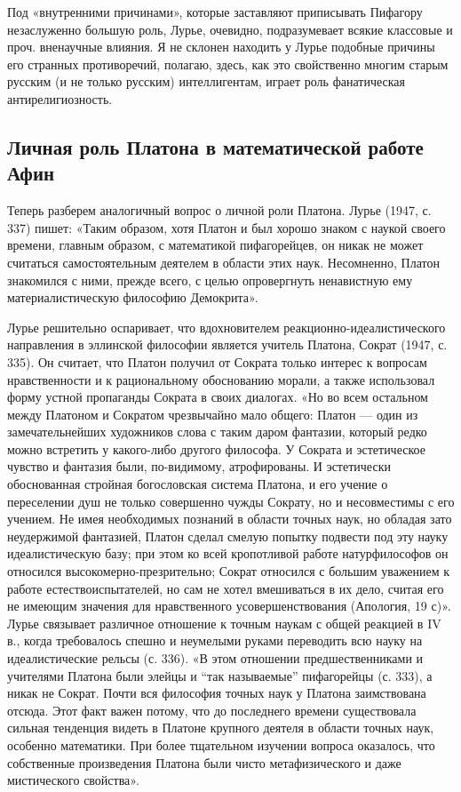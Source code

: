 Под «внутренними причинами», которые заставляют приписывать Пифагору
незаслуженно большую роль, Лурье, очевидно, подразумевает всякие
классовые и проч. вненаучные влияния. Я не склонен находить у Лурье
подобные причины его странных противоречий, полагаю, здесь, как это
свойственно многим старым русским (и не только русским) интеллигентам,
играет роль фанатическая антирелигиозность.

\subsection{Личная роль Платона в математической работе Афин}

Теперь разберем аналогичный вопрос о личной роли Платона. Лурье
(1947, с. 337) пишет: «Таким образом, хотя Платон и был хорошо знаком
с наукой своего времени, главным образом, с математикой пифагорейцев,
он никак не может считаться самостоятельным деятелем в области этих
наук. Несомненно, Платон знакомился с ними, прежде всего, с целью
опровергнуть ненавистную ему материалистическую философию Демокрита».

Лурье решительно оспаривает, что вдохновителем
реакционно-идеалистического направления в эллинской философии является
учитель Платона, Сократ (1947, с. 335). Он считает, что Платон получил
от Сократа только интерес к вопросам нравственности и к рациональному
обоснованию морали, а также использовал форму устной пропаганды
Сократа в своих диалогах. «Но во всем остальном между Платоном и
Сократом чрезвычайно мало общего: Платон --- один из замечательнейших
художников слова с таким даром фантазии, который редко можно встретить
у какого-либо другого философа. У Сократа и эстетическое чувство и
фантазия были, по-видимому, атрофированы. И эстетически обоснованная
стройная богословская система Платона, и его учение о переселении душ
не только совершенно чужды Сократу, но и несовместимы с его учением.
Не имея необходимых познаний в области точных наук, но обладая зато
неудержимой фантазией, Платон сделал смелую попытку подвести под эту
науку идеалистическую базу; при этом ко всей кропотливой работе
натурфилософов он относился высокомерно-презрительно; Сократ относился
с большим уважением к работе естествоиспытателей, но сам не хотел
вмешиваться в их дело, считая его не имеющим значения для
нравственного усовершенствования (Апология, 19 с)». Лурье связывает
различное отношение к точным наукам с общей реакцией в IV в., когда
требовалось спешно и неумелыми руками переводить всю науку на
идеалистические рельсы (с. 336). «В этом отношении предшественниками и
учителями Платона были элейцы и ``так называемые'' пифагорейцы (с.
333), а никак не Сократ. Почти вся философия точных наук у Платона
заимствована отсюда. Этот факт важен потому, что до последнего времени
существовала сильная тенденция видеть в Платоне крупного деятеля в
области точных наук, особенно математики. При более тщательном
изучении вопроса оказалось, что собственные произведения Платона были
чисто метафизического и даже мистического свойства».

